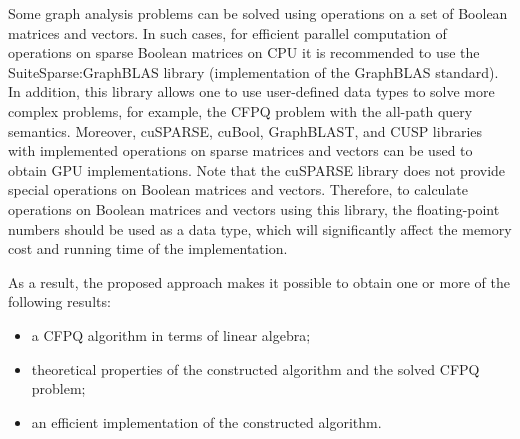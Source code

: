 Some graph analysis problems can be solved using operations on a set of Boolean matrices and vectors. In such cases, for efficient parallel computation of operations on sparse Boolean matrices on CPU it is recommended to use the SuiteSparse:GraphBLAS library (implementation of the GraphBLAS standard). In addition, this library allows one to use user-defined data types to solve more complex problems, for example, the CFPQ problem with the all-path query semantics. Moreover, cuSPARSE, cuBool, GraphBLAST, and CUSP libraries with implemented operations on sparse matrices and vectors can be used to obtain GPU implementations. Note that the cuSPARSE library does not provide special operations on Boolean matrices and vectors. Therefore, to calculate operations on Boolean matrices and vectors using this library, the floating-point numbers should be used as a data type, which will significantly affect the memory cost and running time of the implementation.

As a result, the proposed approach makes it possible to obtain one or more of the following results:
\begin{itemize}
    \item a CFPQ algorithm in terms of linear algebra;
    \item theoretical properties of the constructed algorithm and the solved CFPQ problem;
    \item an efficient implementation of the constructed algorithm.
\end{itemize}


